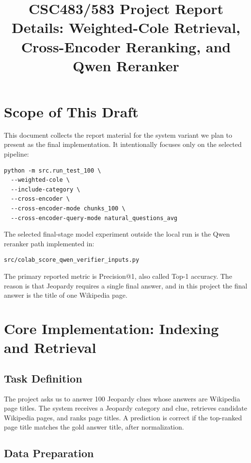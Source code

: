 \documentclass[11pt]{article}
\title{CSC483/583 Project Report Details: Weighted-Cole Retrieval, Cross-Encoder Reranking, and Qwen Reranker}
\author{}
\date{}
\begin{document}
\maketitle

\section*{Scope of This Draft}

This document collects the report material for the system variant we plan to present as the final implementation. It intentionally focuses only on the selected pipeline:

\begin{verbatim}
python -m src.run_test_100 \
  --weighted-cole \
  --include-category \
  --cross-encoder \
  --cross-encoder-mode chunks_100 \
  --cross-encoder-query-mode natural_questions_avg
\end{verbatim}

The selected final-stage model experiment outside the local run is the Qwen reranker path implemented in:

\begin{verbatim}
src/colab_score_qwen_verifier_inputs.py
\end{verbatim}

The primary reported metric is Precision@1, also called Top-1 accuracy. The reason is that Jeopardy requires a single final answer, and in this project the final answer is the title of one Wikipedia page.

\section{Core Implementation: Indexing and Retrieval}

\subsection{Task Definition}

The project asks us to answer 100 Jeopardy clues whose answers are Wikipedia page titles. The system receives a Jeopardy category and clue, retrieves candidate Wikipedia pages, and ranks page titles. A prediction is correct if the top-ranked page title matches the gold answer title, after normalization.

\subsection{Data Preparation}
\end{document}
